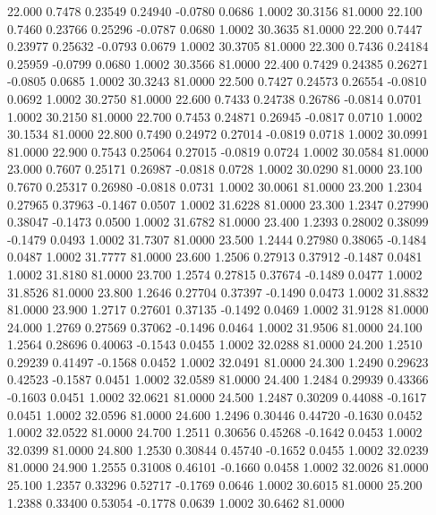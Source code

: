   22.000   0.7478   0.23549   0.24940  -0.0780   0.0686   1.0002  30.3156  81.0000
  22.100   0.7460   0.23766   0.25296  -0.0787   0.0680   1.0002  30.3635  81.0000
  22.200   0.7447   0.23977   0.25632  -0.0793   0.0679   1.0002  30.3705  81.0000
  22.300   0.7436   0.24184   0.25959  -0.0799   0.0680   1.0002  30.3566  81.0000
  22.400   0.7429   0.24385   0.26271  -0.0805   0.0685   1.0002  30.3243  81.0000
  22.500   0.7427   0.24573   0.26554  -0.0810   0.0692   1.0002  30.2750  81.0000
  22.600   0.7433   0.24738   0.26786  -0.0814   0.0701   1.0002  30.2150  81.0000
  22.700   0.7453   0.24871   0.26945  -0.0817   0.0710   1.0002  30.1534  81.0000
  22.800   0.7490   0.24972   0.27014  -0.0819   0.0718   1.0002  30.0991  81.0000
  22.900   0.7543   0.25064   0.27015  -0.0819   0.0724   1.0002  30.0584  81.0000
  23.000   0.7607   0.25171   0.26987  -0.0818   0.0728   1.0002  30.0290  81.0000
  23.100   0.7670   0.25317   0.26980  -0.0818   0.0731   1.0002  30.0061  81.0000
  23.200   1.2304   0.27965   0.37963  -0.1467   0.0507   1.0002  31.6228  81.0000
  23.300   1.2347   0.27990   0.38047  -0.1473   0.0500   1.0002  31.6782  81.0000
  23.400   1.2393   0.28002   0.38099  -0.1479   0.0493   1.0002  31.7307  81.0000
  23.500   1.2444   0.27980   0.38065  -0.1484   0.0487   1.0002  31.7777  81.0000
  23.600   1.2506   0.27913   0.37912  -0.1487   0.0481   1.0002  31.8180  81.0000
  23.700   1.2574   0.27815   0.37674  -0.1489   0.0477   1.0002  31.8526  81.0000
  23.800   1.2646   0.27704   0.37397  -0.1490   0.0473   1.0002  31.8832  81.0000
  23.900   1.2717   0.27601   0.37135  -0.1492   0.0469   1.0002  31.9128  81.0000
  24.000   1.2769   0.27569   0.37062  -0.1496   0.0464   1.0002  31.9506  81.0000
  24.100   1.2564   0.28696   0.40063  -0.1543   0.0455   1.0002  32.0288  81.0000
  24.200   1.2510   0.29239   0.41497  -0.1568   0.0452   1.0002  32.0491  81.0000
  24.300   1.2490   0.29623   0.42523  -0.1587   0.0451   1.0002  32.0589  81.0000
  24.400   1.2484   0.29939   0.43366  -0.1603   0.0451   1.0002  32.0621  81.0000
  24.500   1.2487   0.30209   0.44088  -0.1617   0.0451   1.0002  32.0596  81.0000
  24.600   1.2496   0.30446   0.44720  -0.1630   0.0452   1.0002  32.0522  81.0000
  24.700   1.2511   0.30656   0.45268  -0.1642   0.0453   1.0002  32.0399  81.0000
  24.800   1.2530   0.30844   0.45740  -0.1652   0.0455   1.0002  32.0239  81.0000
  24.900   1.2555   0.31008   0.46101  -0.1660   0.0458   1.0002  32.0026  81.0000
  25.100   1.2357   0.33296   0.52717  -0.1769   0.0646   1.0002  30.6015  81.0000
  25.200   1.2388   0.33400   0.53054  -0.1778   0.0639   1.0002  30.6462  81.0000
